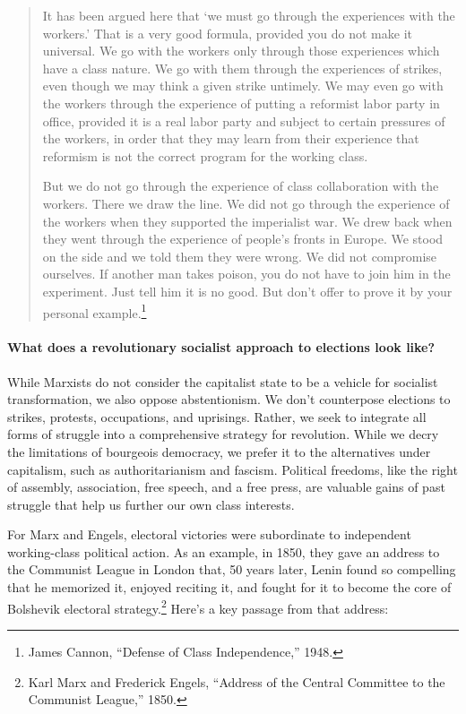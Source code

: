 \blockquote{It has been argued here that `we must go through the experiences with the workers.' That is a very good formula, provided you do not make it universal. We go with the workers only through those experiences which have a class nature. We go with them through the experiences of strikes, even though we may think a given strike untimely. We may even go with the workers through the experience of putting a reformist labor party in office, provided it is a real labor party and subject to certain pressures of the workers, in order that they may learn from their experience that reformism is not the correct program for the working class.

But we do not go through the experience of class collaboration with the workers. There we draw the line. We did not go through the experience of the workers when they supported the imperialist war. We drew back when they went through the experience of people's fronts in Europe. We stood on the side and we told them they were wrong. We did not compromise ourselves. If another man takes poison, you do not have to join him in the experiment. Just tell him it is no good. But don't offer to prove it by your personal example.\footnote{James Cannon, ``Defense of Class Independence,'' 1948.}}

\paragraph{What does a revolutionary socialist approach to elections look like?}

While Marxists do not consider the capitalist state to be a vehicle for socialist transformation, we also oppose abstentionism. We don't counterpose elections to strikes, protests, occupations, and uprisings. Rather, we seek to integrate all forms of struggle into a comprehensive strategy for revolution. While we decry the limitations of bourgeois democracy, we prefer it to the alternatives under capitalism, such as authoritarianism and fascism. Political freedoms, like the right of assembly, association, free speech, and a free press, are valuable gains of past struggle that help us further our own class interests.

For Marx and Engels, electoral victories were subordinate to independent working-class political action. As an example, in 1850, they gave an address to the Communist League in London that, 50 years later, Lenin found so compelling that he memorized it, enjoyed reciting it, and fought for it to become the core of Bolshevik electoral strategy.\footnote{Karl Marx and Frederick Engels, ``Address of the Central Committee to the Communist League,'' 1850.} Here's a key passage from that address:

